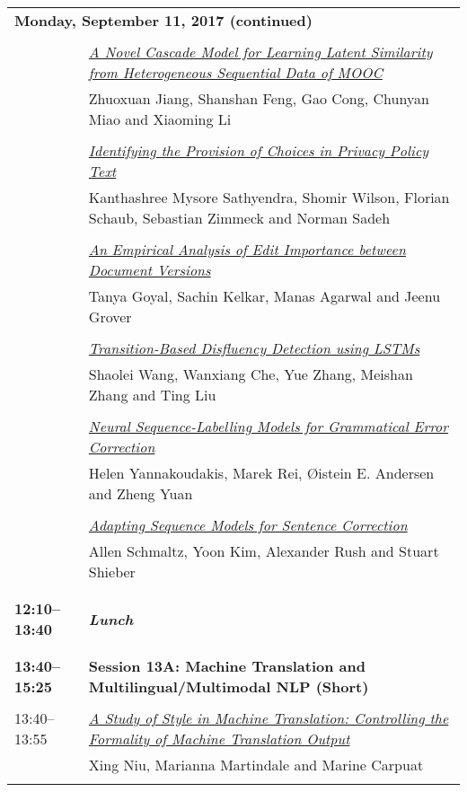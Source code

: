 \begin{tabular}{p{20mm}p{128mm}}
\\
\multicolumn{2}{l}{\bf Monday, September 11, 2017 (continued)} \\\\
 & \hyperlink{page.2751}{\em A Novel Cascade Model for Learning Latent Similarity from Heterogeneous Sequential Data of MOOC}\\
         & Zhuoxuan Jiang, Shanshan Feng, Gao Cong, Chunyan Miao and Xiaoming Li \\
\\

 & \hyperlink{page.2757}{\em Identifying the Provision of Choices in Privacy Policy Text}\\
         & Kanthashree Mysore Sathyendra, Shomir Wilson, Florian Schaub, Sebastian Zimmeck and Norman Sadeh \\
\\

 & \hyperlink{page.2763}{\em An Empirical Analysis of Edit Importance between Document Versions}\\
         & Tanya Goyal, Sachin Kelkar, Manas Agarwal and Jeenu Grover \\
\\

 & \hyperlink{page.2768}{\em Transition-Based Disfluency Detection using LSTMs}\\
         & Shaolei Wang, Wanxiang Che, Yue Zhang, Meishan Zhang and Ting Liu \\
\\

 & \hyperlink{page.2778}{\em Neural Sequence-Labelling Models for Grammatical Error Correction}\\
         & Helen Yannakoudakis, Marek Rei, {\O}istein E. Andersen and Zheng Yuan \\
\\

 & \hyperlink{page.2790}{\em Adapting Sequence Models for Sentence Correction}\\
         & Allen Schmaltz, Yoon Kim, Alexander Rush and Stuart Shieber \\
\\

\\{\bf 12:10--13:40} & {\bf\em Lunch} \\
\\
\\{\bf 13:40--15:25} & {\bf Session 13A: Machine Translation and Multilingual/Multimodal NLP (Short) } \\
\\
13:40--13:55 & \hyperlink{page.2797}{\em A Study of Style in Machine Translation: Controlling the Formality of Machine Translation Output}\\
         & Xing Niu, Marianna Martindale and Marine Carpuat \\
\\


\end{tabular}
